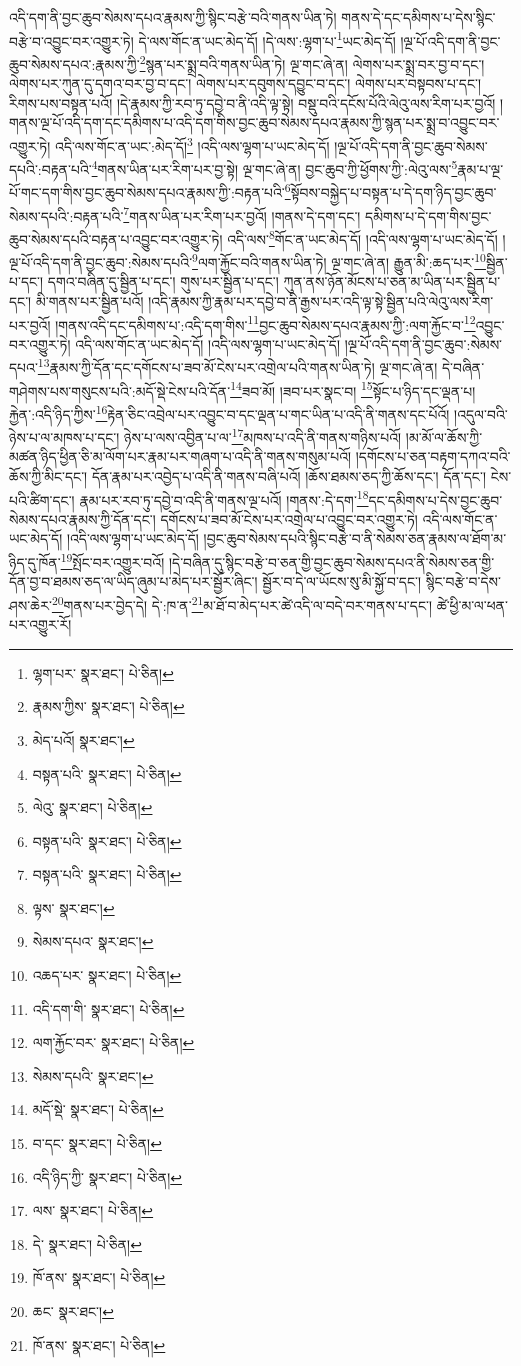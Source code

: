 འདི་དག་ནི་བྱང་ཆུབ་སེམས་དཔའ་རྣམས་ཀྱི་སྙིང་བརྩེ་བའི་གནས་ཡིན་ཏེ། གནས་དེ་དང་དམིགས་པ་དེས་སྙིང་བརྩེ་བ་འབྱུང་བར་འགྱུར་ཏེ། དེ་ལས་གོང་ན་ཡང་མེད་དོ། །དེ་ལས་:ལྷག་པ་\footnote{ལྷག་པར་  སྣར་ཐང་།  པེ་ཅིན། }ཡང་མེད་དོ། །ལྔ་པོ་འདི་དག་ནི་བྱང་ཆུབ་སེམས་དཔའ་:རྣམས་ཀྱི་\footnote{རྣམས་ཀྱིས་  སྣར་ཐང་།  པེ་ཅིན། }སྙན་པར་སྨྲ་བའི་གནས་ཡིན་ཏེ། ལྔ་གང་ཞེ་ན། ལེགས་པར་སྨྲ་བར་བྱ་བ་དང་། ལེགས་པར་ཀུན་དུ་དགའ་བར་བྱ་བ་དང་། ལེགས་པར་དབུགས་དབྱུང་བ་དང་། ལེགས་པར་བསྟབས་པ་དང་། རིགས་པས་བསྟན་པའོ། །དེ་རྣམས་ཀྱི་རབ་ཏུ་དབྱེ་བ་ནི་འདི་ལྟ་སྟེ། བསྡུ་བའི་དངོས་པོའི་ལེའུ་ལས་རིག་པར་བྱའོ། །གནས་ལྔ་པོ་འདི་དག་དང་དམིགས་པ་འདི་དག་གིས་བྱང་ཆུབ་སེམས་དཔའ་རྣམས་ཀྱི་སྙན་པར་སྨྲ་བ་འབྱུང་བར་འགྱུར་ཏེ། འདི་ལས་གོང་ན་ཡང་:མེད་དོ།\footnote{མེད་པའོ།  སྣར་ཐང་། } །འདི་ལས་ལྷག་པ་ཡང་མེད་དོ། །ལྔ་པོ་འདི་དག་ནི་བྱང་ཆུབ་སེམས་དཔའི་:བརྟན་པའི་\footnote{བསྟན་པའི་  སྣར་ཐང་།  པེ་ཅིན། }གནས་ཡིན་པར་རིག་པར་བྱ་སྟེ། ལྔ་གང་ཞེ་ན། བྱང་ཆུབ་ཀྱི་ཕྱོགས་ཀྱི་:ལེའུ་ལས་\footnote{ལེའུ་  སྣར་ཐང་།  པེ་ཅིན། }རྣམ་པ་ལྔ་པོ་གང་དག་གིས་བྱང་ཆུབ་སེམས་དཔའ་རྣམས་ཀྱི་:བརྟན་པའི་\footnote{བསྟན་པའི་  སྣར་ཐང་།  པེ་ཅིན། }སྟོབས་བསྐྱེད་པ་བསྟན་པ་དེ་དག་ཉིད་བྱང་ཆུབ་སེམས་དཔའི་:བརྟན་པའི་\footnote{བསྟན་པའི་  སྣར་ཐང་།  པེ་ཅིན། }གནས་ཡིན་པར་རིག་པར་བྱའོ། །གནས་དེ་དག་དང་། དམིགས་པ་དེ་དག་གིས་བྱང་ཆུབ་སེམས་དཔའི་བརྟན་པ་འབྱུང་བར་འགྱུར་ཏེ། འདི་ལས་\footnote{ལྟས་  སྣར་ཐང་། }གོང་ན་ཡང་མེད་དོ། །འདི་ལས་ལྷག་པ་ཡང་མེད་དོ། །ལྔ་པོ་འདི་དག་ནི་བྱང་ཆུབ་:སེམས་དཔའི་\footnote{སེམས་དཔའ་  སྣར་ཐང་། }ལག་རྐྱོང་བའི་གནས་ཡིན་ཏེ། ལྔ་གང་ཞེ་ན། རྒྱུན་མི་:ཆད་པར་\footnote{འཆད་པར་  སྣར་ཐང་།  པེ་ཅིན། }སྦྱིན་པ་དང་། དགའ་བཞིན་དུ་སྦྱིན་པ་དང་། གུས་པར་སྦྱིན་པ་དང་། ཀུན་ནས་ཉོན་མོངས་པ་ཅན་མ་ཡིན་པར་སྦྱིན་པ་དང་། མི་གནས་པར་སྦྱིན་པའོ། །འདི་རྣམས་ཀྱི་རྣམ་པར་དབྱེ་བ་ནི་རྒྱས་པར་འདི་ལྟ་སྟེ་སྦྱིན་པའི་ལེའུ་ལས་རིག་པར་བྱའོ། །གནས་འདི་དང་དམིགས་པ་:འདི་དག་གིས་\footnote{འདི་དག་གི་  སྣར་ཐང་།  པེ་ཅིན། }བྱང་ཆུབ་སེམས་དཔའ་རྣམས་ཀྱི་:ལག་རྐྱོང་བ་\footnote{ལག་རྐྱོང་བར་  སྣར་ཐང་།  པེ་ཅིན། }འབྱུང་བར་འགྱུར་ཏེ། འདི་ལས་གོང་ན་ཡང་མེད་དོ། །འདི་ལས་ལྷག་པ་ཡང་མེད་དོ། །ལྔ་པོ་འདི་དག་ནི་བྱང་ཆུབ་:སེམས་དཔའ་\footnote{སེམས་དཔའི་  སྣར་ཐང་། }རྣམས་ཀྱི་དོན་དང་དགོངས་པ་ཟབ་མོ་ངེས་པར་འགྲེལ་པའི་གནས་ཡིན་ཏེ། ལྔ་གང་ཞེ་ན། དེ་བཞིན་གཤེགས་པས་གསུངས་པའི་:མདོ་སྡེ་ངེས་པའི་དོན་\footnote{མདོ་སྡེ་  སྣར་ཐང་།  པེ་ཅིན། }ཟབ་མོ། །ཟབ་པར་སྣང་བ། \footnote{བ་དང་  སྣར་ཐང་།  པེ་ཅིན། }སྟོང་པ་ཉིད་དང་ལྡན་པ། རྐྱེན་:འདི་ཉིད་ཀྱིས་\footnote{འདི་ཉིད་ཀྱི་  སྣར་ཐང་།  པེ་ཅིན། }རྟེན་ཅིང་འབྲེལ་པར་འབྱུང་བ་དང་ལྡན་པ་གང་ཡིན་པ་འདི་ནི་གནས་དང་པོའོ། །འདུལ་བའི་ཉེས་པ་ལ་མཁས་པ་དང་། ཉེས་པ་ལས་འབྱིན་པ་ལ་\footnote{ལས་  སྣར་ཐང་།  པེ་ཅིན། }མཁས་པ་འདི་ནི་གནས་གཉིས་པའོ། །མ་མོ་ལ་ཆོས་ཀྱི་མཚན་ཉིད་ཕྱིན་ཅི་མ་ལོག་པར་རྣམ་པར་གཞག་པ་འདི་ནི་གནས་གསུམ་པའོ། །དགོངས་པ་ཅན་བརྟག་དཀའ་བའི་ཆོས་ཀྱི་མིང་དང་། དོན་རྣམ་པར་འབྱེད་པ་འདི་ནི་གནས་བཞི་པའོ། །ཆོས་ཐམས་ཅད་ཀྱི་ཆོས་དང་། དོན་དང་། ངེས་པའི་ཚིག་དང་། རྣམ་པར་རབ་ཏུ་དབྱེ་བ་འདི་ནི་གནས་ལྔ་པའོ། །གནས་:དེ་དག་\footnote{དེ་  སྣར་ཐང་།  པེ་ཅིན། }དང་དམིགས་པ་དེས་བྱང་ཆུབ་སེམས་དཔའ་རྣམས་ཀྱི་དོན་དང་། དགོངས་པ་ཟབ་མོ་ངེས་པར་འགྲེལ་པ་འབྱུང་བར་འགྱུར་ཏེ། འདི་ལས་གོང་ན་ཡང་མེད་དོ། །འདི་ལས་ལྷག་པ་ཡང་མེད་དོ། །བྱང་ཆུབ་སེམས་དཔའི་སྙིང་བརྩེ་བ་ནི་སེམས་ཅན་རྣམས་ལ་ཐོག་མ་ཉིད་དུ་ཁོན་\footnote{ཁོ་ནས་  སྣར་ཐང་།  པེ་ཅིན། }སྤོང་བར་འགྱུར་བའོ། །དེ་བཞིན་དུ་སྙིང་བརྩེ་བ་ཅན་གྱི་བྱང་ཆུབ་སེམས་དཔའ་ནི་སེམས་ཅན་གྱི་དོན་བྱ་བ་ཐམས་ཅད་ལ་ཡིད་ཞུམ་པ་མེད་པར་སྦྱོར་ཞིང་། སྦྱོར་བ་དེ་ལ་ཡོངས་སུ་མི་སྐྱོ་བ་དང་། སྙིང་བརྩེ་བ་དེས་ཤས་ཆེར་\footnote{ཆང་  སྣར་ཐང་། }གནས་པར་བྱེད་དེ། དེ་:ཁ་ན་\footnote{ཁོ་ནས་  སྣར་ཐང་།  པེ་ཅིན། }མ་ཐོ་བ་མེད་པར་ཚེ་འདི་ལ་བདེ་བར་གནས་པ་དང་། ཚེ་ཕྱི་མ་ལ་ཕན་པར་འགྱུར་རོ། 